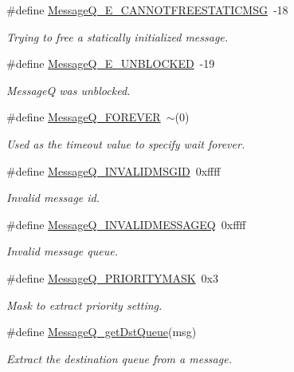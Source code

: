 \begin{DoxyCompactItemize}
\#define \hyperlink{_message_q_8h_a0802e8f4b461e84ddef5a8241432c00b}{MessageQ\_\-E\_\-CANNOTFREESTATICMSG}~-\/18
\begin{DoxyCompactList}\small\item\em Trying to free a statically initialized message. \item\end{DoxyCompactList}\item 
\#define \hyperlink{_message_q_8h_a320bbc58b6a523f70d9866a54d176b44}{MessageQ\_\-E\_\-UNBLOCKED}~-\/19
\begin{DoxyCompactList}\small\item\em MessageQ was unblocked. \item\end{DoxyCompactList}\item 
\#define \hyperlink{_message_q_8h_a9218a5f44331562bea6284890689c2b5}{MessageQ\_\-FOREVER}~$\sim$(0)
\begin{DoxyCompactList}\small\item\em Used as the timeout value to specify wait forever. \item\end{DoxyCompactList}\item 
\#define \hyperlink{_message_q_8h_a370a69d26238b17087490483350a0731}{MessageQ\_\-INVALIDMSGID}~0xffff
\begin{DoxyCompactList}\small\item\em Invalid message id. \item\end{DoxyCompactList}\item 
\#define \hyperlink{_message_q_8h_aa4a5fa703505bd746c9f954a2ffcd43e}{MessageQ\_\-INVALIDMESSAGEQ}~0xffff
\begin{DoxyCompactList}\small\item\em Invalid message queue. \item\end{DoxyCompactList}\item 
\#define \hyperlink{_message_q_8h_a3cde3037a7d7bd3a7cf4291b939200c8}{MessageQ\_\-PRIORITYMASK}~0x3
\begin{DoxyCompactList}\small\item\em Mask to extract priority setting. \item\end{DoxyCompactList}\item 
\#define \hyperlink{_message_q_8h_a6e60f683b011d8c960790b1f395d092b}{MessageQ\_\-getDstQueue}(msg)
\begin{DoxyCompactList}\small\item\em Extract the destination queue from a message. \item\end{DoxyCompactList}\item 

\end{DoxyCompactItemize}
